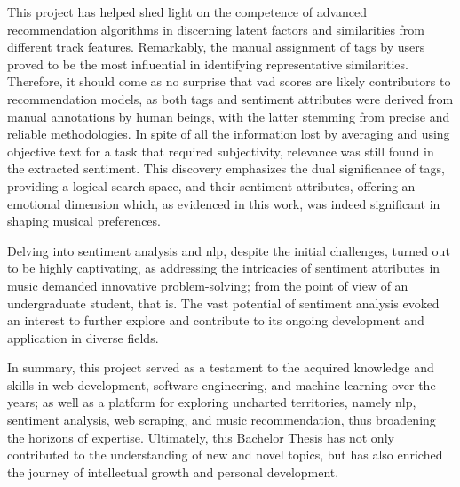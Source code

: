 This project has helped shed light on the competence of advanced recommendation algorithms in discerning latent factors and similarities from different track features. Remarkably, the manual assignment of tags by users proved to be the most influential in identifying representative similarities. Therefore, it should come as no surprise that \acs{vad} scores are likely contributors to recommendation models, as both tags and sentiment attributes were derived from manual annotations by human beings, with the latter stemming from precise and reliable methodologies. In spite of all the information lost by averaging and using objective text for a task that required subjectivity, relevance was still found in the extracted sentiment. This discovery emphasizes the dual significance of tags, providing a logical search space, and their sentiment attributes, offering an emotional dimension which, as evidenced in this work, was indeed significant in shaping musical preferences.

Delving into sentiment analysis and \acs{nlp}, despite the initial challenges, turned out to be highly captivating, as addressing the intricacies of sentiment attributes in music demanded innovative problem-solving; from the point of view of an undergraduate student, that is. The vast potential of sentiment analysis evoked an interest to further explore and contribute to its ongoing development and application in diverse fields.

In summary, this project served as a testament to the acquired knowledge and skills in web development, software engineering, and machine learning over the years; as well as a platform for exploring uncharted territories, namely \acs{nlp}, sentiment analysis, web scraping, and music recommendation, thus broadening the horizons of expertise. Ultimately, this Bachelor Thesis has not only contributed to the understanding of new and novel topics, but has also enriched the journey of intellectual growth and personal development.